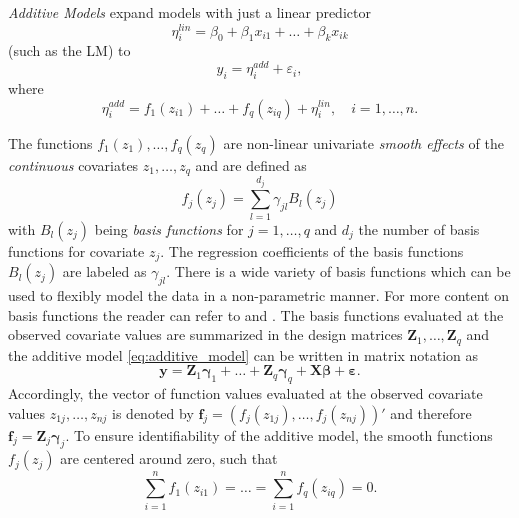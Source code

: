 
\textit{Additive Models} expand models with just a linear predictor  
$$
\eta_{i}^{lin} = \beta_{0}+\beta_{1} x_{i1}+\ldots+\beta_{k} x_{i k}
$$
(such as the \ac{LM}) to 
\begin{equation}
y_{i} = \eta_{i}^{add} + \varepsilon_{i} ,
\label{eq:additive_model}
\end{equation}
where 
\begin{equation}
\eta_{i}^{a d d}=f_{1}\left(z_{i 1}\right)+\ldots+f_{q}\left(z_{i q}\right)+\eta_{i}^{l i n}, \quad i = 1, \ldots, n.
\end{equation}

The functions $f_{1}(z_{1}), \ldots, f_{q}(z_{q})$ are non-linear univariate \textit{smooth effects} of the \textit{continuous} covariates $z_1, \ldots, z_q$ and are defined as
\begin{equation}
f_{j}\left(z_{j}\right)=\sum_{l=1}^{d_{j}} \gamma_{j l} B_{l}\left(z_{j}\right)
\end{equation}
with $B_{l}\left(z_{j}\right)$ being \textit{basis functions} for $j = 1, \ldots, q$ and $d_j$ the number of basis functions for covariate $z_j$. The regression coefficients of the basis functions $B_l(z_j)$ are labeled as $\gamma_{jl}$. There is a wide variety of basis functions which can be used to flexibly model the data in a non-parametric manner. For more content on basis functions the reader can refer to \cite{wood2017generalized} and \cite{fahrmeir2003regression}. The basis functions evaluated at the observed covariate values are summarized in the design matrices $\bm{Z}_1, \ldots, \bm{Z}_q$ and the additive model \ref{eq:additive_model} can be written in matrix notation as
\begin{equation}
\bm{y} = \bm{Z}_1 \bm{\gamma}_1 + \ldots + \bm{Z}_q \bm{\gamma}_q + \bm{X} \bm{\beta} + \bm{\varepsilon}.
\label{eq:gam_matrix_notation}
\end{equation}
Accordingly, the vector of function values evaluated at the observed covariate values $z_{1j}, \ldots, z_{nj}$ is denoted by $\bm{f}_j = (f_j(z_{1j}), \ldots, f_j(z_{nj}))' $ and therefore $\bm{f}_j = \bm{Z}_j \bm{\gamma}_j$. To ensure identifiability of the additive model, the smooth functions $f_j(z_j)$ are centered around zero, such that
$$
\sum_{i=1}^{n} f_{1}\left(z_{i 1}\right)=\ldots=\sum_{i=1}^{n} f_{q}\left(z_{i q}\right)=0.
$$
\\

